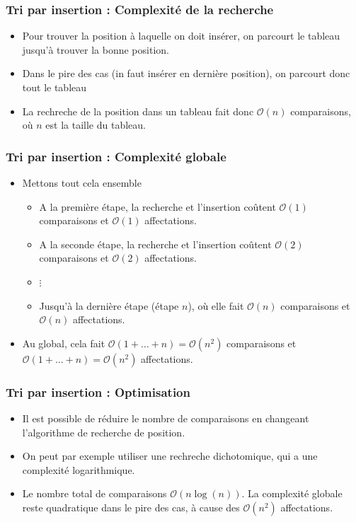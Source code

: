 \documentclass[aspectratio=169]{beamer}
\begin{document}
\begin{frame}
  \frametitle{Tri par insertion : Complexité de la recherche}
  \begin{itemize}
  \item Pour trouver la position à laquelle on doit insérer, on parcourt le
    tableau jusqu'à trouver la bonne position.

  \item Dans le pire des cas (in faut insérer en dernière position), on parcourt
    donc tout le tableau

  \item La rechreche de la position dans un tableau fait donc \(\mathcal{O}(n)\)
    comparaisons, où \(n\) est la taille du tableau.
  \end{itemize}
\end{frame}

\begin{frame}
  \frametitle{Tri par insertion : Complexité globale}
  \begin{itemize}
  \item Mettons tout cela ensemble
    \begin{itemize}
    \item A la première étape, la recherche et l'insertion coûtent
      \(\mathcal{O}(1)\) comparaisons et \(\mathcal{O}(1)\) affectations.

    \item A la seconde étape, la recherche et l'insertion coûtent
      \(\mathcal{O}(2)\) comparaisons et \(\mathcal{O}(2)\) affectations.

    \item[] \(\vdots\)
    \item Jusqu'à la dernière étape (étape \(n\)), où elle fait
      \(\mathcal{O}(n)\) comparaisons et \(\mathcal{O}(n)\) affectations.

    \end{itemize}

  \item Au global, cela fait
    \(\mathcal{O}(1+\ldots+n) = \mathcal{O}(n^{2})\) comparaisons et
    \(\mathcal{O}(1+\ldots+n) = \mathcal{O}(n^{2})\) affectations.
  \end{itemize}
\end{frame}

\begin{frame}
  \frametitle{Tri par insertion : Optimisation}
  \begin{itemize}
  \item Il est possible de réduire le nombre de comparaisons en changeant
    l'algorithme de recherche de position.

  \item On peut par exemple utiliser une \alert{rechreche dichotomique}, qui a
    une complexité logarithmique.

  \item Le nombre total de comparaisons \(\mathcal{O}(n\log(n))\). La complexité
    globale reste quadratique dans le pire des cas, à cause des
    \(\mathcal{O}(n^{2})\) affectations.
  \end{itemize}
\end{frame}
\end{document}
